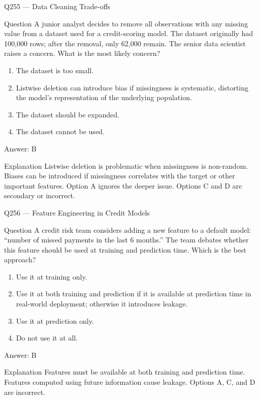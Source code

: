 \documentclass[aspectratio=169,8pt]{beamer}
\begin{document}
\begin{frame}{Q255 --- Data Cleaning Trade-offs}
\begin{block}{Question}
A junior analyst decides to remove all observations with any missing value from a dataset used for a credit-scoring model. The dataset originally had 100,000 rows; after the removal, only 62,000 remain. The senior data scientist raises a concern. What is the most likely concern?
\end{block}
\begin{enumerate}
\item The dataset is too small.
\item Listwise deletion can introduce bias if missingness is systematic, distorting the model's representation of the underlying population.
\item The dataset should be expanded.
\item The dataset cannot be used.
\end{enumerate}
\begin{exampleblock}{Answer: B}\end{exampleblock}
\begin{block}{Explanation}
Listwise deletion is problematic when missingness is non-random. Biases can be introduced if missingness correlates with the target or other important features. Option A ignores the deeper issue. Options C and D are secondary or incorrect.
\end{block}
\end{frame}

\begin{frame}{Q256 --- Feature Engineering in Credit Models}
\begin{block}{Question}
A credit risk team considers adding a new feature to a default model: ``number of missed payments in the last 6 months.'' The team debates whether this feature should be used at training and prediction time. Which is the best approach?
\end{block}
\begin{enumerate}
\item Use it at training only.
\item Use it at both training and prediction if it is available at prediction time in real-world deployment; otherwise it introduces leakage.
\item Use it at prediction only.
\item Do not use it at all.
\end{enumerate}
\begin{exampleblock}{Answer: B}\end{exampleblock}
\begin{block}{Explanation}
Features must be available at both training and prediction time. Features computed using future information cause leakage. Options A, C, and D are incorrect.
\end{block}
\end{frame}
\end{document}
